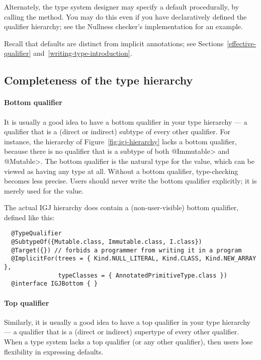 Alternately, the type system designer may specify a default procedurally,
by calling the
method.  You may do this even if you have declaratively defined the
qualifier hierarchy; see the Nullness checker's implementation for an
example.


Recall that defaults are distinct
from implicit annotations; see Sections~\ref{effective-qualifier}
and~\ref{writing-type-introduction}.


\subsection{Completeness of the type hierarchy\label{bottom-and-top-qualifier}}

\label{bottom-qualifier}

\paragraph{Bottom qualifier}
It is usually a good idea to have a bottom qualifier in your type hierarchy
--- a qualifier that is a (direct or indirect) subtype of every other
qualifier.  For instance, the hierarchy of Figure~\ref{fig:igj-hierarchy} lacks
a bottom qualifier, because there is no qualifier that is a subtype of both
\<@Immutable> and \<@Mutable>.
The bottom qualifier is the natural type for the 
value, which can be viewed as having any type at all.  Without a bottom
qualifier, type-checking becomes less precise.
Users should never write the bottom qualifier explicitly; it is merely used
for the  value.

The actual IGJ hierarchy does contain a (non-user-visible) bottom qualifier,
defined like this:

\begin{Verbatim}
  @TypeQualifier
  @SubtypeOf({Mutable.class, Immutable.class, I.class})
  @Target({}) // forbids a programmer from writing it in a program
  @ImplicitFor(trees = { Kind.NULL_LITERAL, Kind.CLASS, Kind.NEW_ARRAY },
               typeClasses = { AnnotatedPrimitiveType.class })
  @interface IGJBottom { }
\end{Verbatim}


\label{top-qualifier}

\paragraph{Top qualifier}
Similarly, it is usually a good idea to have a top qualifier in your type
hierarchy --- a qualifier that is a (direct or indirect) supertype of every
other qualifier.  When a type system lacks a top qualifier (or any other
qualifier), then users lose flexibility in expressing defaults.

